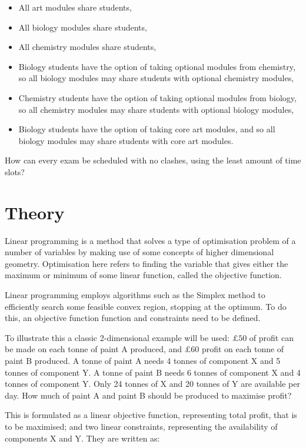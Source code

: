 \begin{itemize}
  \item All art modules share students,
  \item All biology modules share students,
  \item All chemistry modules share students,
  \item Biology students have the option of taking optional modules from
  chemistry, so all biology modules may share students with optional chemistry
  modules,
  \item Chemistry students have the option of taking optional modules from
  biology, so all chemistry modules may share students with optional biology
  modules,
  \item Biology students have the option of taking core art modules, and so all
  biology modules may share students with core art modules.
\end{itemize}

How can every exam be scheduled with no clashes, using the least amount of
time slots?

\section{Theory}\label{sec:theory}

Linear programming is a method that solves a type of optimisation problem of a
number of variables by making use of some concepts of higher dimensional
geometry.  %
Optimisation here refers to finding the variable that gives either the maximum
or minimum of some linear function, called the objective function.

Linear programming employs algorithms such as the Simplex method  %
to efficiently search some feasible convex region, stopping at the optimum. To
do this, an objective function function and constraints need to be defined.

To illustrate this a classic 2-dimensional example will be used: 
\(\pounds 50\) of profit can be made on each
tonne of paint A produced, and \(\pounds 60\) profit on each tonne of paint B 
produced. A tonne of paint A needs 4 tonnes of component X and 5 tonnes of
component Y. A tonne of paint B needs 6 tonnes of component X and 4 tonnes of
component Y. Only 24 tonnes of X and 20 tonnes of Y are available per day. How
much of paint A and paint B should be produced to maximise profit?

This is formulated as a linear objective function, representing total profit,
that is to be maximised; and two linear constraints, representing the
availability of components X and Y. They are written as:

